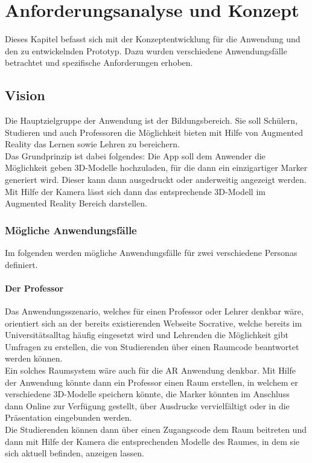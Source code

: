 \chapter{Anforderungsanalyse und Konzept}\label{chap:Konzept}
Dieses Kapitel befasst sich mit der Konzeptentwicklung für die Anwendung und den zu entwickelnden Prototyp. Dazu wurden verschiedene Anwendungsfälle betrachtet und spezifische Anforderungen erhoben.

\section{Vision}
Die Hauptzielgruppe der Anwendung ist der Bildungsbereich. Sie soll Schülern, Studieren und auch Professoren die Möglichkeit bieten mit Hilfe von Augmented Reality das Lernen sowie Lehren zu bereichern. \\
Das Grundprinzip ist dabei folgendes: Die App soll dem Anwender die Möglichkeit geben 3D-Modelle hochzuladen, für die dann ein einzigartiger Marker generiert wird. Dieser kann dann ausgedruckt oder anderweitig angezeigt werden. Mit Hilfe der Kamera lässt sich dann das entsprechende 3D-Modell im Augmented Reality Bereich darstellen.

\subsection{Mögliche Anwendungsfälle}
Im folgenden werden mögliche Anwendungsfälle für zwei verschiedene Personas definiert.

\subsubsection{Der Professor}
Das Anwendungsszenario, welches für einen Professor oder Lehrer denkbar wäre, orientiert sich an der bereits existierenden Webseite Socrative, welche bereits im Universitätsalltag häufig eingesetzt wird und Lehrenden die Möglichkeit gibt Umfragen zu erstellen, die von Studierenden über einen Raumcode beantwortet werden können. \\
Ein solches Raumsystem wäre auch für die AR Anwendung denkbar.
Mit Hilfe der Anwendung könnte dann ein Professor einen Raum erstellen, in welchem er verschiedene 3D-Modelle speichern könnte, die Marker könnten im Anschluss dann Online zur Verfügung gestellt, über Ausdrucke vervielfältigt oder in die Präsentation eingebunden werden.\\
Die Studierenden können dann über einen Zugangscode dem Raum beitreten und dann mit Hilfe der Kamera die  entsprechenden Modelle des Raumes, in dem sie sich aktuell befinden, anzeigen lassen.

